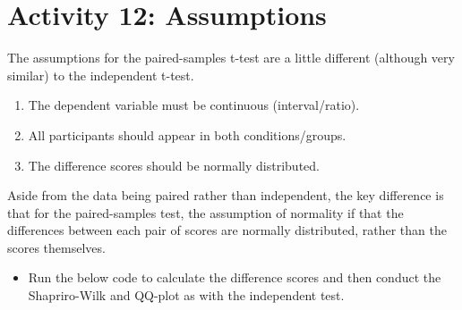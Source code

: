 \documentclass[]{book}
\newenvironment{Shaded}{\begin{snugshade}}{\end{snugshade}}
\newcommand{\DataTypeTok}[1]{\textcolor[rgb]{0.13,0.29,0.53}{#1}}
\newcommand{\DecValTok}[1]{\textcolor[rgb]{0.00,0.00,0.81}{#1}}
\newcommand{\KeywordTok}[1]{\textcolor[rgb]{0.13,0.29,0.53}{\textbf{#1}}}
\newcommand{\NormalTok}[1]{#1}
\newcommand{\OperatorTok}[1]{\textcolor[rgb]{0.81,0.36,0.00}{\textbf{#1}}}
\newcommand{\StringTok}[1]{\textcolor[rgb]{0.31,0.60,0.02}{#1}}
\providecommand{\tightlist}{%
  \setlength{\itemsep}{0pt}\setlength{\parskip}{0pt}}
\begin{document}
\begin{Shaded}
\end{Shaded}

\hypertarget{activity-12-assumptions}{%
\section{Activity 12: Assumptions}\label{activity-12-assumptions}}

The assumptions for the paired-samples t-test are a little different (although very similar) to the independent t-test.

\begin{enumerate}
\def\labelenumi{\arabic{enumi}.}
\tightlist
\item
  The dependent variable must be continuous (interval/ratio).\\
\item
  All participants should appear in both conditions/groups.
\item
  The difference scores should be normally distributed.
\end{enumerate}

Aside from the data being paired rather than independent, the key difference is that for the paired-samples test, the assumption of normality if that the differences between each pair of scores are normally distributed, rather than the scores themselves.

\begin{itemize}
\tightlist
\item
  Run the below code to calculate the difference scores and then conduct the Shapriro-Wilk and QQ-plot as with the independent test.
\end{itemize}

\begin{Shaded}
\end{Shaded}
\end{document}
